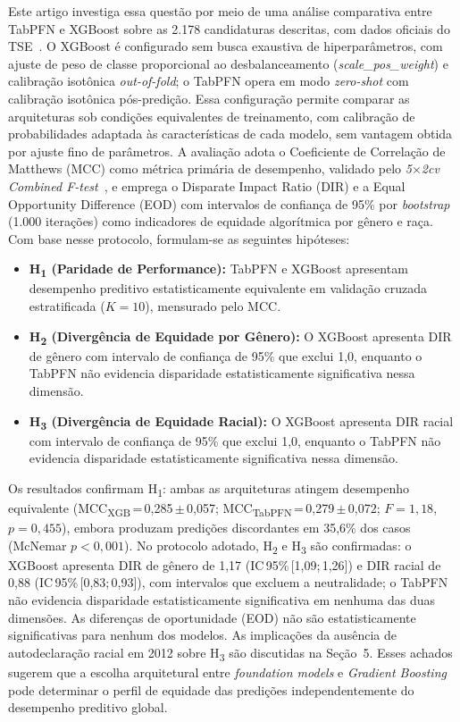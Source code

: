 \documentclass[12pt]{article}
\begin{document}
Este artigo investiga essa questão por meio de uma análise
comparativa entre TabPFN e XGBoost sobre as 2.178 candidaturas
descritas, com dados oficiais do TSE~\cite{basedosdados:2026}. O
XGBoost é configurado sem busca exaustiva de hiperparâmetros, com
ajuste de peso de classe proporcional ao desbalanceamento
(\textit{scale\_pos\_weight}) e calibração isotônica
\textit{out-of-fold}; o TabPFN opera em modo \textit{zero-shot} com
calibração isotônica pós-predição. Essa configuração permite
comparar as arquiteturas sob condições equivalentes de treinamento,
com calibração de probabilidades adaptada às características de cada
modelo, sem vantagem obtida por ajuste fino de parâmetros. A
avaliação adota o Coeficiente de Correlação de Matthews (MCC) como
métrica primária de desempenho, validado pelo \textit{5$\times$2cv
Combined F-test}~\cite{alpaydin:1999}, e emprega o Disparate Impact
Ratio (DIR) e a Equal Opportunity Difference (EOD) com intervalos de
confiança de 95\% por \textit{bootstrap} (1.000 iterações) como
indicadores de equidade algorítmica por gênero e raça. Com base
nesse protocolo, formulam-se as seguintes hipóteses:

\begin{itemize}
  \item \textbf{H\textsubscript{1} (Paridade de Performance):}
  TabPFN e XGBoost apresentam desempenho preditivo estatisticamente
  equivalente em validação cruzada estratificada ($K=10$), mensurado
  pelo MCC.

  \item \textbf{H\textsubscript{2} (Divergência de Equidade por
  Gênero):} O XGBoost apresenta DIR de gênero com intervalo de
  confiança de 95\% que exclui 1{,}0, enquanto o TabPFN não evidencia
  disparidade estatisticamente significativa nessa dimensão.

  \item \textbf{H\textsubscript{3} (Divergência de Equidade Racial):}
  O XGBoost apresenta DIR racial com intervalo de confiança de 95\%
  que exclui 1{,}0, enquanto o TabPFN não evidencia disparidade
  estatisticamente significativa nessa dimensão.
\end{itemize}

Os resultados confirmam H\textsubscript{1}: ambas as arquiteturas
atingem desempenho equivalente
(MCC\textsubscript{XGB}\,=\,0{,}285\,$\pm$\,0{,}057;
MCC\textsubscript{TabPFN}\,=\,0{,}279\,$\pm$\,0{,}072;
$F=1{,}18$, $p=0{,}455$), embora produzam predições discordantes
em 35{,}6\% dos casos (McNemar $p<0{,}001$). No protocolo adotado,
H\textsubscript{2} e H\textsubscript{3} são confirmadas: o XGBoost
apresenta DIR de gênero de 1{,}17 (IC\,95\%\,[1{,}09;\,1{,}26]) e
DIR racial de 0{,}88 (IC\,95\%\,[0{,}83;\,0{,}93]), com intervalos
que excluem a neutralidade; o TabPFN não evidencia disparidade
estatisticamente significativa em nenhuma das duas dimensões. As
diferenças de oportunidade (EOD) não são estatisticamente
significativas para nenhum dos modelos. As implicações da ausência
de autodeclaração racial em 2012 sobre H\textsubscript{3} são
discutidas na Seção~5. Esses achados sugerem que a escolha
arquitetural entre \textit{foundation models} e \textit{Gradient
Boosting} pode determinar o perfil de equidade das predições
independentemente do desempenho preditivo global.
\end{document}
